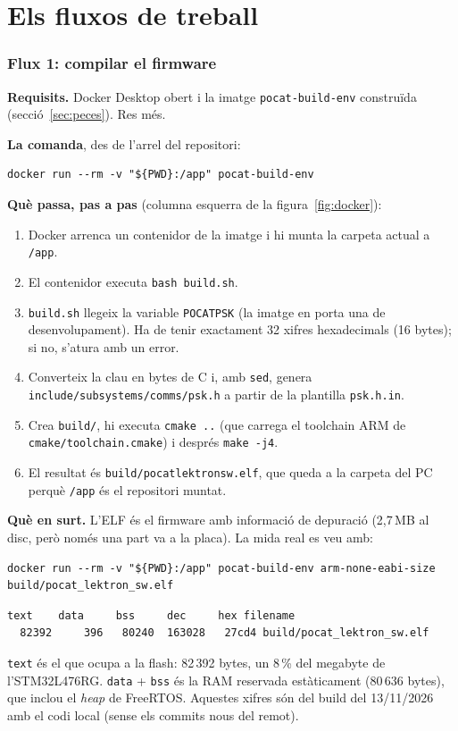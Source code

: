 \documentclass[11pt,a4paper]{article}
\DeclareRobustCommand{\_}{\textunderscore\allowbreak}
\newcommand{\cd}[1]{\texttt{#1}}
\begin{document}
\part{Els fluxos de treball}

\section{Flux 1: compilar el firmware}\label{sec:build}

\textbf{Requisits.} Docker Desktop obert i la imatge \cd{pocat-build-env} construïda
(secció~\ref{sec:peces}). Res més.

\textbf{La comanda}, des de l'arrel del repositori:
\begin{lstlisting}
docker run --rm -v "${PWD}:/app" pocat-build-env
\end{lstlisting}

\textbf{Què passa, pas a pas} (columna esquerra de la figura~\ref{fig:docker}):
\begin{enumerate}
\item Docker arrenca un contenidor de la imatge i hi munta la carpeta actual a \cd{/app}.
\item El contenidor executa \cd{bash build.sh}.
\item \cd{build.sh} llegeix la variable \cd{POCAT\_PSK} (la imatge en porta una de
  desenvolupament). Ha de tenir exactament 32 xifres hexadecimals (16 bytes); si no, s'atura
  amb un error.
\item Converteix la clau en bytes de C i, amb \cd{sed}, genera
  \cd{include/subsystems/comms/psk.h} a partir de la plantilla \cd{psk.h.in}.
\item Crea \cd{build/}, hi executa \cd{cmake ..} (que carrega el toolchain ARM de
  \cd{cmake/toolchain.cmake}) i després \cd{make -j4}.
\item El resultat és \cd{build/pocat\_lektron\_sw.elf}, que queda a la carpeta del PC perquè
  \cd{/app} és el repositori muntat.
\end{enumerate}

\textbf{Què en surt.} L'ELF és el firmware amb informació de depuració (2,7\,MB al disc,
però només una part va a la placa). La mida real es veu amb:
\begin{lstlisting}
docker run --rm -v "${PWD}:/app" pocat-build-env arm-none-eabi-size build/pocat_lektron_sw.elf
\end{lstlisting}
\begin{lstlisting}[style=out]
   text    data     bss     dec     hex filename
  82392     396   80240  163028   27cd4 build/pocat_lektron_sw.elf
\end{lstlisting}
\cd{text} és el que ocupa a la flash: 82\,392 bytes, un 8\,\% del megabyte de l'STM32L476RG.
\cd{data} + \cd{bss} és la RAM reservada estàticament (80\,636 bytes), que inclou el
\emph{heap} de FreeRTOS. Aquestes xifres són del build del 13/11/2026 amb el codi local
(sense els commits nous del remot).
\end{document}
